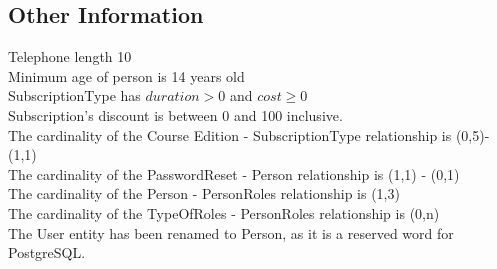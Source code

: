 \subsection{Other Information}
Telephone length 10\\
Minimum age of person is 14 years old\\
SubscriptionType has $duration > 0$ and $cost \ge 0$\\
Subscription's discount is between 0 and 100 inclusive.\\
The cardinality of the Course Edition - SubscriptionType relationship is (0,5)-(1,1)\\
The cardinality of the PasswordReset - Person relationship is (1,1) - (0,1) \\
The cardinality of the Person - PersonRoles relationship is (1,3) \\
The cardinality of the TypeOfRoles - PersonRoles relationship is (0,n) \\
The User entity has been renamed to Person, as it is a reserved word for PostgreSQL.\\